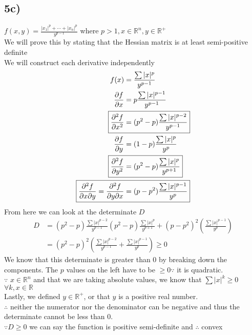 \documentclass[12pt,letter]{article}
\begin{document}
\subsection*{5c)}
$f(x,y) = \frac{|x_1|^p +\cdots+ |x_n|^p}{y^{p-1}}$ where $p>1, x\in\mathbb{R}^n, y\in\mathbb{R}^+$
\\
We will prove this by stating that the Hessian matrix is at least semi-positive definite \\
We will construct each derivative independently
\begin{align*}
    f(x) &= \frac{\sum|x|^p}{y^{p-1}} \\
    \frac{\partial f}{\partial x} &= p\frac{\sum|x|^{p-1}}{y^{p-1}} \\
    \Aboxed{\frac{\partial^2 f}{\partial x^2} &= (p^2 - p)\frac{\sum|x|^{p-2}}{y^{p-1}}} \\
    \frac{\partial f}{\partial y} &= (1-p)\frac{\sum|x|^p}{y^p} \\
    \Aboxed{\frac{\partial^2 f}{\partial y^2} &= (p^2-p)\frac{\sum|x|^p}{y^{p+1}}} \\
    \Aboxed{\frac{\partial^2 f}{\partial x \partial y} = \frac{\partial^2 f}{\partial y \partial x} &= (p-p^2)\frac{\sum|x|^{p-1}}{y^p}}
\end{align*}
From here we can look at the determinate $D$
\begin{align*}
    D &= (p^2-p)\frac{\sum|x|^{p-2}}{y^{p-1}}(p^2-p)\frac{\sum|x|^p}{y^{p+1}} + (p-p^2)^2\left(\frac{\sum|x|^{p-1}}{y^p}\right) \\
      &= (p^2-p)^2\left(\frac{\sum|x|^{p-2}}{y^{p-1}} + \frac{\sum|x|^{p-1}}{y^p} \right) \geq 0
\end{align*}
We know that this determinate is greater than 0 by breaking down the components.
The $p$ values on the left have to be $\geq 0 \because$ it is quadratic.\\
$\because$ $x\in\mathbb{R}^n$ and that we are taking absolute values, we know
that $\sum|x|^k \geq 0$  $\forall k,x\in\mathbb{R}$ \\
Lastly, we defined $y \in \mathbb{R^+}$, or that $y$ is a positive real number. \\
$\therefore$ neither the numerator nor the denominator can be negative and thus
the determinate cannot be less than 0.\\
$\because D\geq 0$ we can say the function is positive semi-definite and 
$\therefore$ convex
\end{document}
